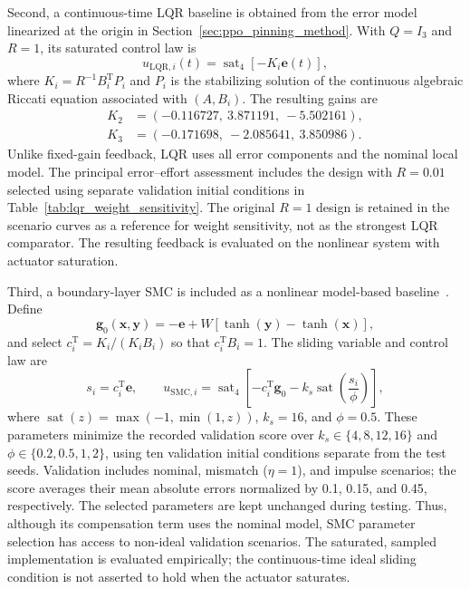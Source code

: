 \documentclass[a4paper,fleqn]{cas-dc}
\theoremstyle{plain}
\theoremstyle{definition}
\begin{document}
Second, a continuous-time LQR baseline is obtained from the error model linearized at the origin in Section~\ref{sec:ppo_pinning_method}. With $Q=I_3$ and $R=1$, its saturated control law is
\begin{equation}
	u_{\mathrm{LQR},i}(t)=\operatorname{sat}_{4}\!\left[-K_i\mathbf e(t)\right],
	\label{eq:lqr_baseline}
\end{equation}
where $K_i=R^{-1}B_i^{\mathrm T}P_i$ and $P_i$ is the stabilizing solution of the continuous algebraic Riccati equation associated with $(A,B_i)$. The resulting gains are
\[
\begin{aligned}
K_2&=(-0.116727,\ 3.871191,\ -5.502161),\\
K_3&=(-0.171698,\ -2.085641,\ 3.850986).
\end{aligned}
\]
Unlike fixed-gain feedback, LQR uses all error components and the nominal local model. The principal error--effort assessment includes the design with $R=0.01$ selected using separate validation initial conditions in Table~\ref{tab:lqr_weight_sensitivity}. The original $R=1$ design is retained in the scenario curves as a reference for weight sensitivity, not as the strongest LQR comparator. The resulting feedback is evaluated on the nonlinear system with actuator saturation.

Third, a boundary-layer SMC is included as a nonlinear model-based baseline~\cite{feki2009sliding,su2021fixed}. Define
\begin{equation}
	\mathbf g_0(\mathbf x,\mathbf y)=-\mathbf e+W\left[\tanh(\mathbf y)-\tanh(\mathbf x)\right],
	\label{eq:nominal_error_drift}
\end{equation}
and select $c_i^{\mathrm T}=K_i/(K_iB_i)$ so that $c_i^{\mathrm T}B_i=1$. The sliding variable and control law are
\begin{equation}
	s_i=c_i^{\mathrm T}\mathbf e,\qquad
	u_{\mathrm{SMC},i}=\operatorname{sat}_{4}\!\left[-c_i^{\mathrm T}\mathbf g_0-k_s\operatorname{sat}\!\left(\frac{s_i}{\phi}\right)\right],
	\label{eq:smc_baseline}
\end{equation}
where $\operatorname{sat}(z)=\max(-1,\min(1,z))$, $k_s=16$, and $\phi=0.5$. These parameters minimize the recorded validation score over $k_s\in\{4,8,12,16\}$ and $\phi\in\{0.2,0.5,1,2\}$, using ten validation initial conditions separate from the test seeds. Validation includes nominal, mismatch ($\eta=1$), and impulse scenarios; the score averages their mean absolute errors normalized by 0.1, 0.15, and 0.45, respectively. The selected parameters are kept unchanged during testing. Thus, although its compensation term uses the nominal model, SMC parameter selection has access to non-ideal validation scenarios. The saturated, sampled implementation is evaluated empirically; the continuous-time ideal sliding condition is not asserted to hold when the actuator saturates.
\end{document}

